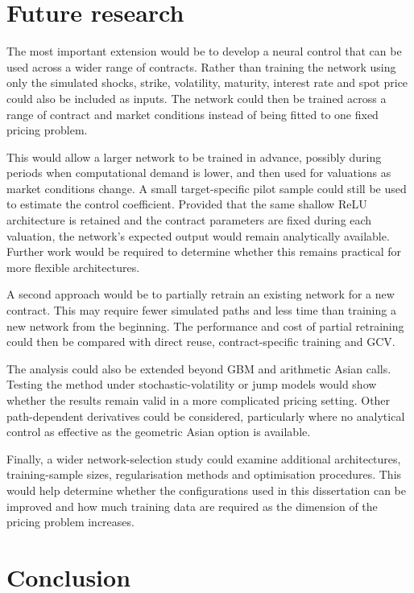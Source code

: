 \section{Future research}

The most important extension would be to develop a neural control that can be used across a wider range of contracts. Rather than training the network using only the simulated shocks, strike, volatility, maturity, interest rate and spot price could also be included as inputs. The network could then be trained across a range of contract and market conditions instead of being fitted to one fixed pricing problem.

This would allow a larger network to be trained in advance, possibly during periods when computational demand is lower, and then used for valuations as market conditions change. A small target-specific pilot sample could still be used to estimate the control coefficient. Provided that the same shallow ReLU architecture is retained and the contract parameters are fixed during each valuation, the network's expected output would remain analytically available. Further work would be required to determine whether this remains practical for more flexible architectures.

A second approach would be to partially retrain an existing network for a new contract. This may require fewer simulated paths and less time than training a new network from the beginning. The performance and cost of partial retraining could then be compared with direct reuse, contract-specific training and GCV.

The analysis could also be extended beyond GBM and arithmetic Asian calls. Testing the method under stochastic-volatility or jump models would show whether the results remain valid in a more complicated pricing setting. Other path-dependent derivatives could be considered, particularly where no analytical control as effective as the geometric Asian option is available.

Finally, a wider network-selection study could examine additional architectures, training-sample sizes, regularisation methods and optimisation procedures. This would help determine whether the configurations used in this dissertation can be improved and how much training data are required as the dimension of the pricing problem increases.

\section{Conclusion}

